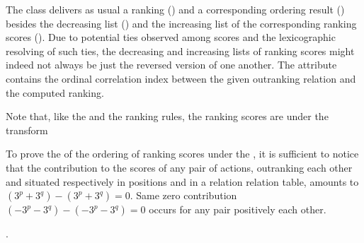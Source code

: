 \documentclass[a4paper,12pt,english]{sphinxhowto}
\begin{document}
\sphinxAtStartPar
The class delivers as usual a ranking () and a corresponding ordering result () besides the decreasing list () and the increasing list of the corresponding  ranking scores (). Due to potential ties observed among  scores and the lexicographic resolving of such ties, the decreasing and increasing lists of ranking scores might indeed not always be just the reversed version of one another. The  attribute contains the ordinal correlation index between the given outranking relation and the computed  ranking.

\sphinxAtStartPar
Note that, like the  and the  ranking rules, the  ranking scores are  under the  transform %
\begin{footnote}[22]\sphinxAtStartFootnote
To prove the  of the ordering of  ranking scores under the , it is sufficient to notice that the contribution to the  scores of any pair of actions, outranking each other and situated respectively in positions  and  in a relation relation table, amounts to  \((3^p + 3^q) - (3^p + 3^q) = 0\). Same zero contribution \((-3^p - 3^q) - (-3^p - 3^q) = 0\) occurs for any pair positively  each other.
%
\end{footnote}.
\end{document}
